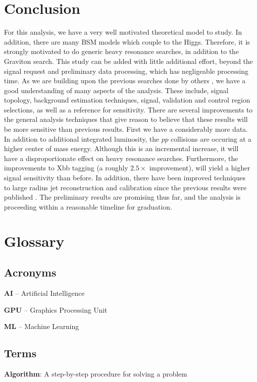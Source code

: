 \documentclass[12pt]{article}
\newcommand{\term}[2]{\textbf{#1}: #2}
\newcommand{\acronym}[2]{\textbf{#1} -- #2}
\begin{document}
\section{Conclusion}
For this analysis, we have a very well motivated theoretical model to study. In
addition, there are many BSM models which couple to the Higgs. Therefore, it is
strongly motivated to do generic heavy resonance searches, in addition to the
Graviton search. This study can be added with little additional effort, beyond
the signal request and preliminary data processing, which has negligeable
processing time. As we are building upon the previous searches done by others
\cite{previous_results}, we have a good understanding of many aspects of the
analysis. These include, signal topology, background estimation techniques,
signal, validation and control region selections, as well as a reference for
sensitivity. There are several improvements to the general analysis techniques
that give reason to believe that these results will be more sensitive than
previous results. First we have a considerably more data. In addition to
additional integrated luminosity, the $pp$ collisions are occuring at a higher
center of mass energy. Although this is an incremental increase, it will have a
disproportionate effect on heavy resonance searches. Furthermore, the
improvements to Xbb tagging (a roughly $2.5\times$ improvement), will yield a
higher signal sensitivity than before. In addition, there have been improved
techniques to large radius jet reconstruction and calibration since the previous
results were published \cite{large_r_jet}. The preliminary results are promising
thus far, and the analysis is proceeding within a reasonable timeline for
graduation.


\newpage
{}
\section{Glossary}
\subsection{Acronyms}
\acronym{AI}{Artificial Intelligence}

\acronym{GPU}{Graphics Processing Unit}

\acronym{ML}{Machine Learning}

\subsection{Terms}
\term{Algorithm}{A step-by-step procedure for solving a problem}
\end{document}
